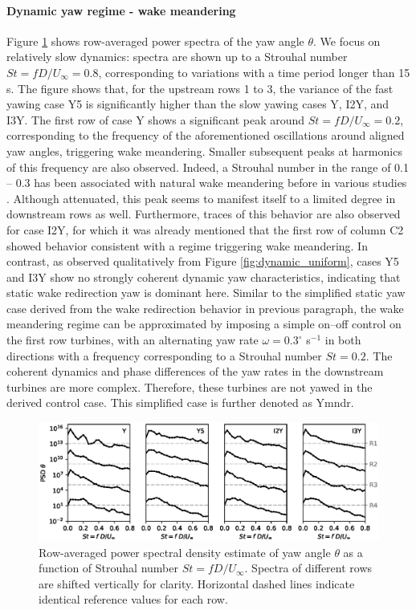 	\paragraph{Dynamic yaw regime - wake meandering}
	Figure \ref{fig:spec_uniform} shows row-averaged power spectra of the yaw angle $\theta$. We focus on relatively slow dynamics: spectra are shown up to a Strouhal number $St = f D/U_\infty = 0.8$, corresponding to variations with a time period longer than 15 s. The figure shows that, for the upstream rows 1 to 3, the variance of the fast yawing case Y5 is significantly higher than the slow yawing cases Y, I2Y, and I3Y. The first row of case Y shows a significant peak around $St = f D/U_\infty= 0.2$, corresponding to the frequency of the aforementioned oscillations around aligned yaw angles, triggering wake meandering. Smaller subsequent peaks at harmonics of this frequency are also observed. Indeed, a Strouhal number in the range of 0.1 -- 0.3 has been associated with natural wake meandering before in various studies \citep{medici2008measurements, howard2015statistics}. Although attenuated, this peak seems to manifest itself to a limited degree in downstream rows as well. Furthermore, traces of this behavior are also observed for case I2Y, for which it was already mentioned that the first row of column C2 showed behavior consistent with a regime triggering wake meandering. In contrast, as observed qualitatively from Figure \ref{fig:dynamic_uniform}, cases Y5 and I3Y show no strongly coherent dynamic yaw characteristics, indicating that static wake redirection yaw is dominant here. Similar to the simplified static yaw case derived from the wake redirection behavior in previous paragraph, the wake meandering regime can be approximated by imposing a simple on--off control on the first row turbines, with an alternating yaw rate $\omega = 0.3^\circ$ s$^{-1}$ in both directions with a frequency corresponding to a Strouhal number $St = 0.2$. The coherent dynamics and phase differences of the yaw rates in the downstream turbines are more complex. Therefore, these turbines are not yawed in the derived control case. This simplified case is further denoted as Ymndr. 
	\begin{figure}
		\includegraphics[width=\textwidth]{chapters/optimal_yaw_control/PSD_laminar.eps}
		\caption{Row-averaged power spectral density estimate of yaw angle $\theta$ as a function of Strouhal number $St = f D/U_\infty$. Spectra of different rows are shifted vertically for clarity. Horizontal dashed lines indicate identical reference values for each row.\label{fig:spec_uniform}}
	\end{figure}
	
